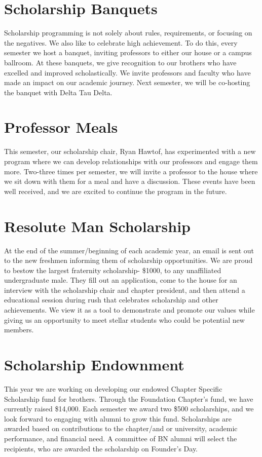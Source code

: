   \section*{Scholarship Banquets}
    Scholarship programming is not solely about rules, requirements, or focusing on the negatives. We also like to celebrate high achievement. To do this, every semester we host a banquet, inviting professors to either our house or a campus ballroom. At these banquets, we give recognition to our brothers who have excelled and improved scholastically. We invite professors and faculty who have made an impact on our academic journey. Next semester, we will be co-hosting the banquet with Delta Tau Delta. \\

  \section*{Professor Meals}
    This semester, our scholarship chair, Ryan Hawtof, has experimented with a new program where we can develop relationships with our professors and engage them more. Two-three times per semester, we will invite a professor to the house where we sit down with them for a meal and have a discussion. These events have been well received, and we are excited to continue the program in the future.
    
  \section*{Resolute Man Scholarship}
    At the end of the summer/beginning of each academic year, an email is sent out to the new freshmen informing them of scholarship opportunities. We are proud to bestow the largest fraternity scholarship- \$1000, to any unaffiliated undergraduate male. They fill out an application, come to the house for an interview with the scholarship chair and chapter president, and then attend a educational session during rush that celebrates scholarship and other achievements. We view it as a tool to demonstrate and promote our values while giving us an opportunity to meet stellar students who could be potential new members.
    
  \section*{Scholarship Endownment}  
    This year we are working on developing our endowed Chapter Specific Scholarship fund for brothers. Through the Foundation Chapter's fund, we have currently raised \$14,000. Each semester we award two \$500 scholarships, and we look forward to engaging with alumni to grow this fund. Scholarships are awarded based on contributions to the chapter/and or university, academic performance, and financial need. A committee of BN alumni will select the recipients, who are awarded the scholarship on Founder's Day. 
        
